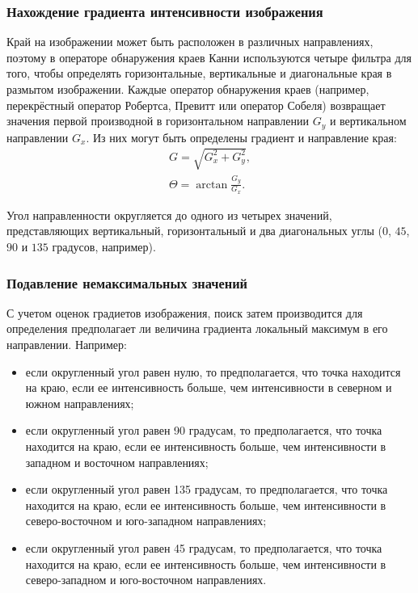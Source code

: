 \subsubsection{Нахождение градиента интенсивности изображения}
Край на изображении может быть расположен в различных направлениях, поэтому в операторе обнаружения краев Канни используются четыре фильтра для того, чтобы определять горизонтальные, вертикальные и диагональные края в размытом изображении. Каждые оператор обнаружения краев (например, перекрёстный оператор Робертса, Превитт или оператор Собеля) возвращает значения первой производной в горизонтальном направлении $G_y$ и вертикальном направлении $G_x$. Из них могут быть определены градиент и направление края:
\begin{gather*}
  G = \sqrt{G_x^2 + G_y^2},\\
  \Theta = \arctan{\frac{G_y}{G_x}}.
\end{gather*}

Угол направленности округляется до одного из четырех значений, представляющих вертикальный, горизонтальный и два диагональных углы ($0$, $45$, $90$ и $135$ градусов, например).

\subsubsection{Подавление немаксимальных значений}
С учетом оценок градиетов изображения, поиск затем производится для определения предполагает ли величина градиента локальный максимум в его направлении. Например:
\begin{itemize}
  \item если округленный угол равен нулю, то предполагается, что точка находится на краю, если ее интенсивность больше, чем интенсивности в северном и южном направлениях;
  \item если округленный угол равен 90 градусам, то предполагается, что точка находится на краю, если ее интенсивность больше, чем интенсивности в западном и восточном направлениях;
  \item если округленный угол равен 135 градусам, то предполагается, что точка находится на краю, если ее интенсивность больше, чем интенсивности в северо-восточном и юго-западном направлениях;
  \item если округленный угол равен 45 градусам, то предполагается, что точка находится на краю, если ее интенсивность больше, чем интенсивности в северо-западном и юго-восточном направлениях.
\end{itemize}

